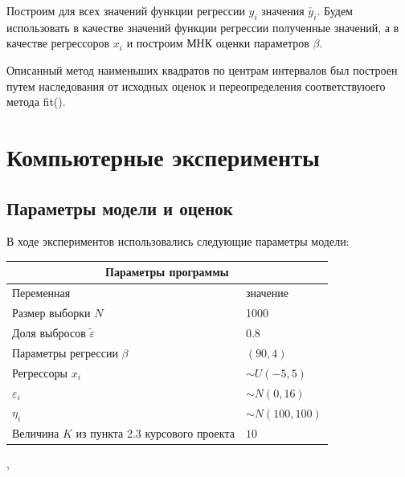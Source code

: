Построим для всех значений функции регрессии $y_i$ значения $\check{y_i}$.
Будем использовать в качестве значений функции регрессии полученные значений, а в качестве регрессоров $x_i$ и построим МНК оценки параметров $\beta$.

Описанный метод наименьших квадратов по центрам интервалов был построен путем наследования от исходных оценок и переопределения соответствуюего метода fit(). 


\newpage
\section{Компьютерные эксперименты}
\subsection{Параметры модели и оценок}
В ходе экспериментов использовались следующие параметры модели:
\begin{center}
    \begin{tabular}{|p{5cm}|p{5cm}|}
        \hline
        \multicolumn{2}{|c|}{Параметры программы} \\
        \hline
        Переменная&значение\\
        \hline
        Размер выборки $N$& 1000\\
        \hline
        Доля выбросов $\widetilde{\varepsilon}$& 0.8\\
        \hline
        Параметры регрессии $\beta$& $(90,4)$\\
        \hline
        Регрессоры $x_i$ & $\sim U(-5,5)$\\
        \hline
        $\varepsilon_i$&$\sim N(0,16)$\\
        \hline
        $\eta_i$&$\sim N(100,100)$\\
        \hline
        Величина $K$ из пункта 2.3 курсового проекта &$10$\\
        \hline
    \end{tabular},
\end{center}
\newpage

